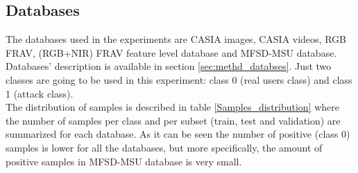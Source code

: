 \subsection{Databases} \label{subssec:ejec1_database}
The databases used in the experiments are CASIA images, CASIA videos, RGB FRAV, (RGB+NIR) FRAV feature level database and MFSD-MSU database. Databases' description is available in section \ref{sec:methd_databses}. Just two classes are going to be used in this experiment: class 0 (real users class) and class 1 (attack class).\\

The distribution of samples is described in table \ref{Samples_distribution} where the number of samples per class and  per subset (train, test and validation) are summarized for each database. As it can be seen the number of positive (class 0) samples is lower for all the databases, but more specifically, the amount of positive samples in MFSD-MSU database is very small.\\

